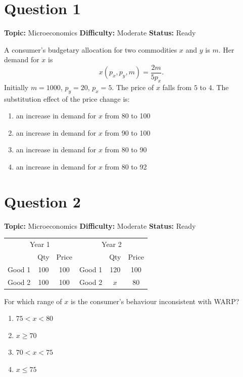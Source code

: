 \documentclass[11pt]{article}
\begin{document}
\newpage
\tableofcontents
\newpage

\section*{Question 1}


\noindent\textbf{Topic:} Microeconomics \quad \textbf{Difficulty:} Moderate \quad \textbf{Status:} Ready



A consumer's budgetary allocation for two commodities $x$ and $y$ is $m$. Her demand for $x$ is
\[
x(p_x,p_y,m)=\frac{2m}{5p_x}.
\]
Initially $m=1000$, $p_y=20$, $p_x=5$. The price of $x$ falls from $5$ to $4$. The substitution effect of the price change is:
\begin{enumerate}[label=(\Alph*)]
\item an increase in demand for $x$ from 80 to 100
\item an increase in demand for $x$ from 90 to 100
\item an increase in demand for $x$ from 80 to 90
\item an increase in demand for $x$ from 80 to 92
\end{enumerate}

\newpage

\section*{Question 2}


\noindent\textbf{Topic:} Microeconomics \quad \textbf{Difficulty:} Moderate \quad \textbf{Status:} Ready



\begin{center}
\begin{tabular}{lcc|lcc}
\toprule
\multicolumn{3}{c|}{Year 1} & \multicolumn{3}{c}{Year 2} \\
& Qty & Price & & Qty & Price \\
\midrule
Good 1 & 100 & 100 & Good 1 & 120 & 100 \\
Good 2 & 100 & 100 & Good 2 & $x$ & 80 \\
\bottomrule
\end{tabular}
\end{center}
For which range of $x$ is the consumer's behaviour inconsistent with WARP?
\begin{enumerate}[label=(\Alph*)]
\item $75<x<80$
\item $x\ge 70$
\item $70<x<75$
\item $x\le 75$
\end{enumerate}
\end{document}
